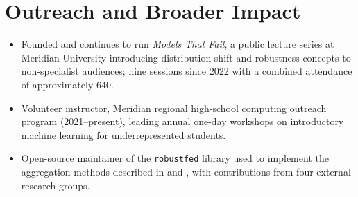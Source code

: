 \section{Outreach and Broader Impact}
\begin{itemize}
  \item Founded and continues to run \emph{Models That Fail}, a public lecture series at Meridian University introducing distribution-shift and robustness concepts to non-specialist audiences; nine sessions since 2022 with a combined attendance of approximately 640.
  \item Volunteer instructor, Meridian regional high-school computing outreach program (2021--present), leading annual one-day workshops on introductory machine learning for underrepresented students.
  \item Open-source maintainer of the \texttt{robustfed} library used to implement the aggregation methods described in \citep{rostova2022robust} and \citep{rostova2021federated}, with contributions from four external research groups.
\end{itemize}

